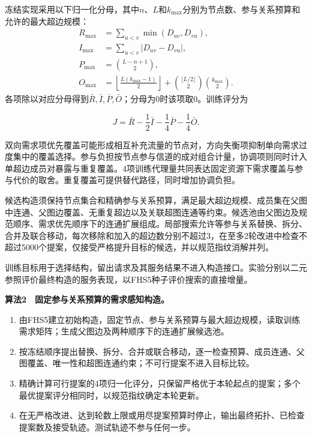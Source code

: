 \documentclass[UTF8,a4paper,twocolumn,fontset=none,zihao=5]{ctexart}
\newcommand{\algtitle}[1]{\par\Needspace{6\baselineskip}\smallskip\noindent\textbf{#1}\par\smallskip}
\begin{document}
冻结实现采用以下归一化分母，其中$n$、$L$和$k_{\max}$分别为节点数、参与关系预算和允许的最大超边规模：
\[
\begin{aligned}
R_{\max}&=\sum_{u<v}\min(D_{uv},D_{vu}),\\
I_{\max}&=\sum_{u<v}|D_{uv}-D_{vu}|,\\
P_{\max}&=\binom{L-n+1}{2},\\
O_{\max}&=\left\lfloor\frac{L(k_{\max}-1)}{2}\right\rfloor
+\binom{\lfloor L/2\rfloor}{2}\binom{k_{\max}}{2}.
\end{aligned}
\]
各项除以对应分母得到$\bar R,\bar I,\bar P,\bar O$；分母为0时该项取0。训练评分为



\begin{equation}
J=\bar R-\frac{1}{2}\bar I-\frac{1}{4}\bar P-\frac{1}{4}\bar O.
\label{eq:11}\end{equation}


双向需求项优先覆盖可能形成相互补充流量的节点对，方向失衡项抑制单向需求过度集中的覆盖选择。参与负担按节点参与信道的成对组合计量，协调项则同时计入单超边成员对暴露与重复覆盖。4项训练代理量共同表达固定资源下需求覆盖与参与代价的取舍。重复覆盖可提供替代路径，同时增加协调负担。


候选构造须保持节点集合和精确参与关系预算，满足最大超边规模、成员集在父图中连通、父图边覆盖、无重复超边以及关联超图连通等约束。候选池由父图边及规范顺序、需求优先顺序下的连通扩展组成。局部搜索允许等参与关系替换、拆分、合并及联合移动，每次移除和加入的超边数分别不超过3，在至多2轮改进中检查不超过5000个提案，仅接受严格提升目标的候选，并以规范指纹消解并列。


训练目标用于选择结构，留出请求及其服务结果不进入构造接口。实验分别以二元参照评价最终构造的服务表现，以FHS5种子评价搜索的直接增量。


\algtitle{算法2　固定参与关系预算的需求感知构造。}\begin{enumerate}

\item 由FHS5建立初始构造，固定节点、参与关系预算与最大超边规模，读取训练需求矩阵；生成父图边及两种顺序下的连通扩展候选池。

\item 按冻结顺序提出替换、拆分、合并或联合移动，逐一检查预算、成员连通、父图覆盖、唯一性和超图连通约束；不可行提案不进入目标比较。

\item 精确计算可行提案的4项归一化评分，只保留严格优于本轮起点的提案；多个最优提案评分相同时，以规范指纹确定本轮更新。

\item 在无严格改进、达到轮数上限或用尽提案预算时停止，输出最终拓扑、已检查提案数及接受轨迹。测试轨迹不参与任何一步。

\end{enumerate}
\end{document}
